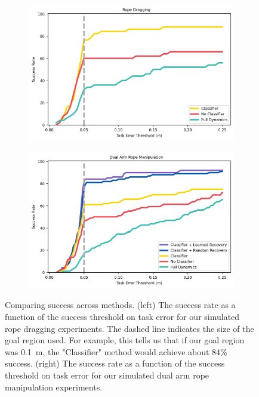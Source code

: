 \begin{figure}
    \centering
    \begin{subfigure}[b]{0.49\textwidth}
        \centering
        \includegraphics[width=\textwidth]{Chap2/images/dragging_success.jpeg}
        \label{Scirob:fig:dragging_success}
    \end{subfigure}
    \hfill
    \begin{subfigure}[b]{0.49\textwidth}
        \centering
        \includegraphics[width=\textwidth]{Chap2/images/dual_success.jpeg}
        \label{Scirob:fig:dual_success}
    \end{subfigure}
    \caption{Comparing success across methods. (left) The success rate as a function of the success threshold on task error for our simulated rope dragging experiments. The dashed line indicates the size of the goal region used. For example, this tells us that if our goal region was \SI{0.1}{\meter}, the "Classifier" method would achieve about 84\% success. (right) The success rate as a function of the success threshold on task error for our simulated dual arm rope manipulation experiments.}
    \label{Scirob:fig:figure6}
\end{figure}

